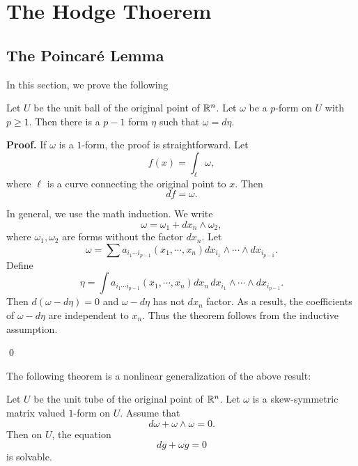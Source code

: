 

\chapter{The Hodge Thoerem}\label{Hodge_theorem}

\section{The Poincar\'e Lemma}\label{Poincare_Lemma}
In this section, we prove the following

\begin{theorem} Let $U$ be the unit ball of the original point of $\mathbb R^n$. Let $\omega$ be a $p$-form on $U$ with $p\geq 1$. Then there is a $p-1$ form $\eta$ such that $\omega=d\eta$.
\end{theorem}

{\bf Proof.} 
If $\omega$ is a $1$-form, the proof is straightforward. Let 
\[
f(x)=\int_{\ell}\omega,
\]
where $\ell$ is a curve connecting the original point to $x$. Then
\[
df=\omega.
\]

In general, we use the math induction. We write
\[
\omega=\omega_1+dx_n\wedge\omega_2,
\]
where $\omega_1,\omega_2$ are forms without the factor $dx_n$. Let
\[
\omega=\sum a_{i_1\cdots i_{p-1}}(x_1,\cdots,x_n)dx_{i_1}\wedge\cdots\wedge dx_{i_{p-1}}.
\]
Define
\[
\eta=\int a_{i_1\cdots i_{p-1}}(x_1,\cdots,x_n)dx_n\, dx_{i_1}\wedge\cdots\wedge dx_{i_{p-1}}.
\]
Then $d(\omega-d\eta)=0$ and $\omega-d\eta$ has not $dx_n$ factor. As a result, the coefficients of $\omega-d\eta$ are independent to $x_n$. Thus the theorem follows from the inductive assumption.

\qed

The following theorem is a nonlinear generalization of the above result:

\begin{theorem} 
Let $U$ be the unit tube of the original point of $\mathbb R^n$.
Let $\omega$ is a skew-symmetric matrix valued $1$-form on $U$. Assume that
\[
d\omega+\omega\wedge\omega=0.
\]
Then on $U$, the equation
\[
dg+\omega g=0
\]
is solvable.
\end{theorem}

